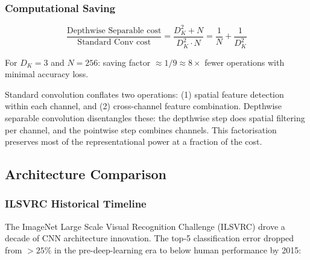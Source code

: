 \documentclass[11pt,a4paper]{article}
\begin{document}
\subsubsection{Computational Saving}

\[
\frac{\text{Depthwise Separable cost}}{\text{Standard Conv cost}} = \frac{D_K^2 + N}{D_K^2 \cdot N} = \frac{1}{N} + \frac{1}{D_K^2}
\]

For $D_K = 3$ and $N = 256$: saving factor $\approx 1/9 \approx 8\times$ fewer operations with minimal accuracy loss.

\begin{insightbox}
Standard convolution conflates two operations: (1) spatial feature detection within each channel, and (2) cross-channel feature combination. Depthwise separable convolution disentangles these: the depthwise step does spatial filtering per channel, and the pointwise step combines channels. This factorisation preserves most of the representational power at a fraction of the cost.
\end{insightbox}

\subsection{Architecture Comparison}
\label{sec:arch_comparison}

\subsubsection{ILSVRC Historical Timeline}

The ImageNet Large Scale Visual Recognition Challenge (ILSVRC) drove a decade of CNN architecture innovation. The top-5 classification error dropped from $>25\%$ in the pre-deep-learning era to below human performance by 2015:
\end{document}
